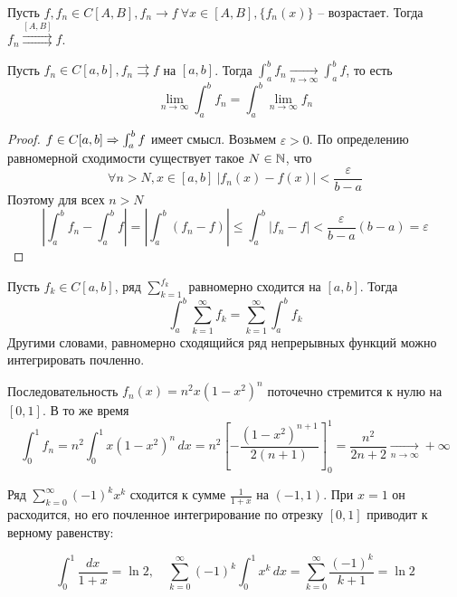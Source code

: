 \begin{Thm}
	Пусть $f, f_n \in C[A, B], f_n \to f \ \forall x \in [A, B], \{f_n(x)\}$ -- возрастает. Тогда $f_n \overset{[A, B]}{\rightrightarrows}f$. 
\end{Thm}

\begin{Thm}
	Пусть $f_n \in C[a, b], f_n \rightrightarrows f$ на $[a, b]$. Тогда $\int_{a}^{b} f_n \xrightarrow[n \to \infty]{} \int_{a}^{b} f$, то есть
	\[\lim_{n \to \infty} \int_{a}^{b} f_n = \int_{a}^{b} \lim_{n \to \infty} f_n\] 
\end{Thm}

\begin{proof}
	$f \in C[a, b] \Rightarrow \int_{a}^{b} f$ имеет смысл. Возьмем $\varepsilon > 0$. 
	По определению равномерной сходимости существует такое $N \in \mathbb{N}$, что
	\[\forall n > N, x \in [a, b] \ |f_n(x) - f(x)| < \frac{\varepsilon}{b - a}\]
	Поэтому для всех $n > N$
	\[\left|\int_{a}^{b} f_n - \int_{a}^{b} f\right| = \left|\int_{a}^{b} (f_n - f)\right| \leqslant \int_{a}^{b} |f_n - f| < \frac{\varepsilon}{b - a}(b - a) = \varepsilon\]
\end{proof}

\begin{Thm}
	Пусть $f_k \in C[a, b]$, ряд $\sum_{k=1}^{f_k}$ равномерно сходится на $[a, b]$. Тогда
	\[\int_{a}^{b} \sum_{k=1}^{\infty} f_k = \sum_{k=1}^{\infty} \int_{a}^{b} f_k\] 
	Другими словами, равномерно сходящийся ряд непрерывных функций можно интегрировать почленно.
\end{Thm}

\begin{Example}
	Последовательность $f_n(x) = n^2 x(1 - x^2)^n$ поточечно стремится к нулю на $[0, 1]$. В то же время
	\[\int_{0}^{1} f_n = n^2 \int_{0}^{1} x(1 - x^2)^n \,dx = n^2 \left[- \frac{(1 - x^2)^{n + 1}}{2(n + 1)}\right]_0^1 = \frac{n^2}{2n + 2} \xrightarrow[n \to \infty]{} +\infty\]  
\end{Example}

\begin{Example}
	Ряд $\sum_{k=0}^{\infty} (-1)^k x^k$ сходится к сумме $\frac{1}{1 + x}$ на $(-1, 1)$. При $x = 1$ он расходится, но его почленное интегрирование по отрезку $[0, 1]$ приводит к верному равенству:
	
	\[\int_{0}^{1} \frac{dx}{1 + x} = \ln 2, \quad \sum_{k=0}^{\infty} (-1)^k \int_{0}^{1} x^k \,dx = \sum_{k=0}^{\infty} \frac{(-1)^k}{k + 1} = \ln 2\]
\end{Example}

